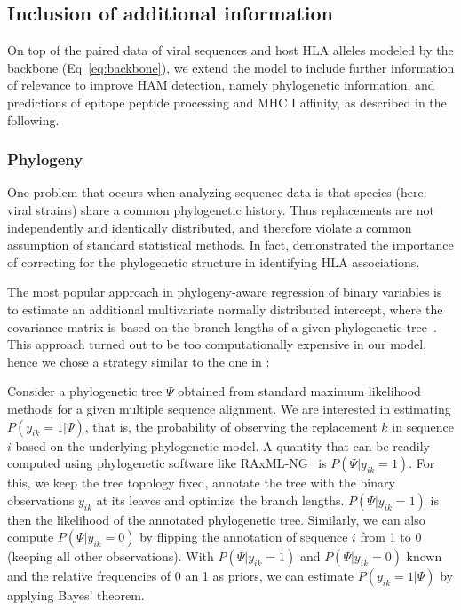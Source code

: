 \documentclass{bioinfo}
\begin{document}
\begin{methods}

\subsection{Inclusion of additional information}

On top of the paired data of viral sequences and host HLA alleles modeled by the backbone (Eq~\ref{eq:backbone}), we extend the model to include further information of relevance to improve HAM detection, namely phylogenetic information, and predictions of epitope peptide processing and MHC I affinity, as described in the following.

\subsubsection{Phylogeny}
One problem that occurs when analyzing sequence data is that species (here: viral strains) share a common phylogenetic history. Thus replacements are not independently and identically distributed, and therefore violate a common assumption of standard statistical methods. In fact, \citet{Bhattacharya2007} demonstrated the importance of correcting for the phylogenetic structure in identifying HLA associations.

The most popular approach in phylogeny-aware regression of binary variables is to estimate an additional multivariate normally distributed intercept, where the covariance matrix is based on the branch lengths of a given phylogenetic tree~\citep{Ives2009, Ives2014}.
This approach turned out to be too computationally expensive in our model, hence we chose a strategy similar to the one in \citet{Carlson2008}:

Consider a phylogenetic tree \(\Psi\) obtained from standard maximum likelihood methods for a given multiple sequence alignment. We are interested in estimating \(P(y_{ik}=1|\Psi)\), that is, the probability of observing the replacement \(k\) in sequence \(i\) based on the underlying phylogenetic model. A quantity that can be readily computed using phylogenetic software like RAxML-NG~\cite{Kozlov2019} is \(P(\Psi|y_{ik}=1)\). For this, we keep the tree topology fixed, annotate the tree with the binary observations \(y_{ik}\) at its leaves and optimize the branch lengths. \(P(\Psi|y_{ik}=1)\) is then the likelihood of the annotated phylogenetic tree. Similarly, we can also compute \(P(\Psi|y_{ik}=0)\) by flipping the annotation of sequence $i$ from 1 to 0 (keeping all other observations). With  $P(\Psi|y_{ik}=1)$ and $P(\Psi|y_{ik}=0)$ known and the relative frequencies of 0 an 1 as priors, we can estimate $P(y_{ik}=1|\Psi)$ by applying Bayes' theorem.


\end{methods}
\end{document}
